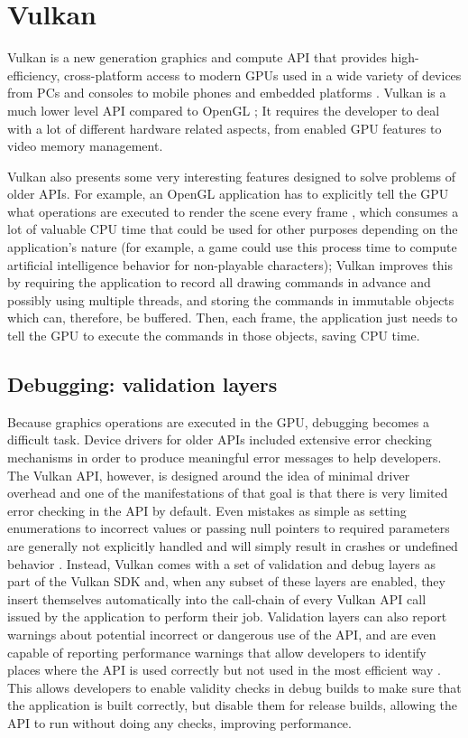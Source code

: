 \chapter{Vulkan}
Vulkan is a new generation graphics and compute API that provides high-efficiency, cross-platform access to modern GPUs used in a wide variety of devices from PCs and consoles to mobile phones and embedded platforms \cite{vulkan}. Vulkan is a much lower level API compared to OpenGL \cite{sellers:2016}; It requires the developer to deal with a lot of different hardware related aspects, from enabled GPU features to video memory management.

Vulkan also presents some very interesting features designed to solve problems of older APIs. For example, an OpenGL application has to explicitly tell the GPU what operations are executed to render the scene every frame \cite{opengl_spec}, which consumes a lot of valuable CPU time that could be used for other purposes depending on the application's nature (for example, a game could use this process time to compute artificial intelligence behavior for non-playable characters); Vulkan improves this by requiring the application to record all drawing commands in advance and possibly using multiple threads, and storing the commands in immutable objects which can, therefore, be buffered. Then, each frame, the application just needs to tell the GPU to execute the commands in those objects, saving CPU time.

\section{Debugging: validation layers}
Because graphics operations are executed in the GPU, debugging becomes a difficult task. Device drivers for older APIs included extensive error checking mechanisms in order to produce meaningful error messages to help developers. The Vulkan API, however, is designed around the idea of minimal driver overhead and one of the manifestations of that goal is that there is very limited error checking in the API by default. Even mistakes as simple as setting enumerations to incorrect values or passing null pointers to required parameters are generally not explicitly handled and will simply result in crashes or undefined behavior \cite{vulkan_tutorial}. Instead, Vulkan comes with a set of validation and debug layers as part of the Vulkan SDK and, when any subset of these layers are enabled, they insert themselves automatically into the call-chain of every Vulkan API call issued by the application to perform their job. Validation layers can also report warnings about potential incorrect or dangerous use of the API, and are even capable of reporting performance warnings that allow developers to identify places where the API is used correctly but not used in the most efficient way \cite{vulkan_validation_layers}. This allows developers to enable validity checks in debug builds to make sure that the application is built correctly, but disable them for release builds, allowing the API to run without doing any checks, improving performance.

